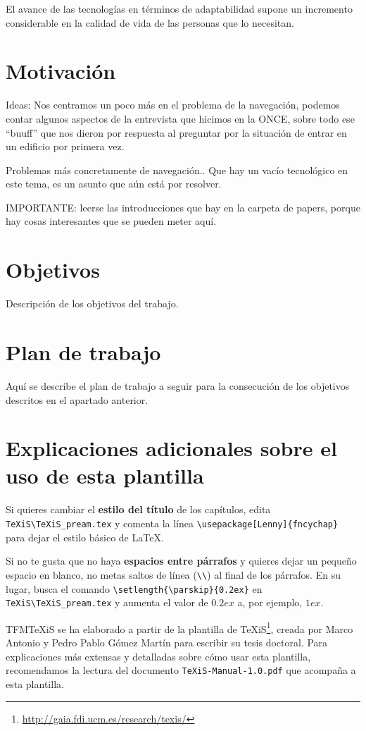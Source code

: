 El avance de las tecnologías en términos de adaptabilidad supone un incremento considerable en la calidad de vida de las personas que lo necesitan.  


\section{Motivación}
Ideas: Nos centramos un poco más en el problema de la navegación, podemos contar algunos aspectos de la entrevista que hicimos en la ONCE, sobre todo ese ``buuff'' que nos dieron por respuesta al preguntar por la situación de entrar en un edificio por primera vez.

Problemas más concretamente de navegación..
Que hay un vacío tecnológico en este tema, es un asunto que aún está por resolver.

IMPORTANTE: leerse las introducciones que hay en la carpeta de papers, porque hay cosas interesantes que se pueden meter aquí.
\section{Objetivos}
Descripción de los objetivos del trabajo.


\section{Plan de trabajo}
Aquí se describe el plan de trabajo a seguir para la consecución de los objetivos descritos en el apartado anterior.



\section{Explicaciones adicionales sobre el uso de esta plantilla}
Si quieres cambiar el \textbf{estilo del título} de los capítulos, edita \verb|TeXiS\TeXiS_pream.tex| y comenta la línea \verb|\usepackage[Lenny]{fncychap}| para dejar el estilo básico de \LaTeX.

Si no te gusta que no haya \textbf{espacios entre párrafos} y quieres dejar un pequeño espacio en blanco, no metas saltos de línea (\verb|\\|) al final de los párrafos. En su lugar, busca el comando  \verb|\setlength{\parskip}{0.2ex}| en \verb|TeXiS\TeXiS_pream.tex| y aumenta el valor de $0.2ex$ a, por ejemplo, $1ex$.

TFMTeXiS se ha elaborado a partir de la plantilla de TeXiS\footnote{\url{http://gaia.fdi.ucm.es/research/texis/}}, creada por Marco Antonio y Pedro Pablo Gómez Martín para escribir su tesis doctoral. Para explicaciones más extensas y detalladas sobre cómo usar esta plantilla, recomendamos la lectura del documento \texttt{TeXiS-Manual-1.0.pdf} que acompaña a esta plantilla.

